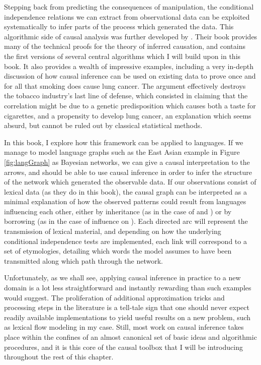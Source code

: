 Stepping back from predicting the consequences of manipulation, the conditional independence relations we can extract from observational data can be exploited systematically to infer parts of the process which generated the data. This algorithmic side of causal analysis was further developed by \cite{spirtes_ea_2000}. Their book provides many of the technical proofs for the theory of inferred causation, and contains the first versions of several central algorithms which I will build upon in this book. It also provides a wealth of impressive examples, including a very in-depth discussion of how causal inference can be used on existing data to prove once and for all that smoking does cause lung cancer. The argument effectively destroys the tobacco industry's last line of defense, which consisted in claiming that the correlation might be due to a genetic predisposition which causes both a taste for cigarettes, and a propensity to develop lung cancer, an explanation which seems absurd, but cannot be ruled out by 
classical statistical methods.

In this book, I explore how this framework can be applied to languages. If we manage to model language graphs such as the East Asian example in Figure \ref{fig:langGraph} as Bayesian networks, we can give a causal interpretation to the arrows, and should be able to use causal inference in order to infer the structure of the network which generated the observable data. If our observations consist of lexical data (as they do in this book), the causal graph can be interpreted as a minimal explanation of how the observed patterns could result from languages influencing each other, either by inheritance (as in the case of  and ) or by borrowing (as in the case of  influence on ). Each directed arc will represent the transmission of lexical material, and depending on how the underlying conditional independence tests are implemented, each link will correspond to a set of etymologies, detailing which words the model assumes to have been transmitted  along which path through the network.

Unfortunately, as we shall see, applying causal inference in practice to a new domain is a lot less straightforward and instantly rewarding than such examples would suggest. The proliferation of additional approximation tricks and processing steps in the literature is a tell-tale sign that one should never expect readily available implementations to yield useful results on a new problem, such as lexical flow modeling in my case. Still, most work on causal inference takes place within the confines of an almost canonical set of basic ideas and algorithmic procedures, and it is this core of the causal toolbox that I will be introducing throughout the rest of this chapter.

